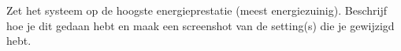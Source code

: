 Zet het systeem op de hoogste energieprestatie (meest energiezuinig).
Beschrijf hoe je dit gedaan hebt en maak een screenshot van de setting(s) die je gewijzigd hebt.

